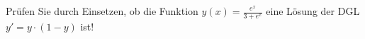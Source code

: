 \item Prüfen Sie durch Einsetzen, ob die Funktion $y(x) = \frac{e^x}{3+e^x}$ eine Lösung der DGL $y' = y\cdot(1-y)$ ist!
